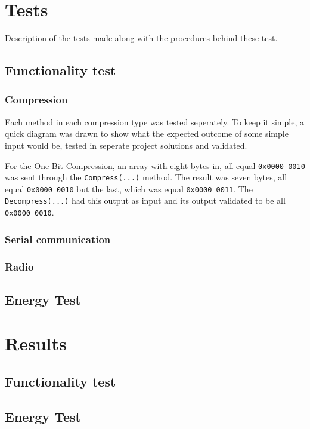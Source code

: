 \section{Tests}
Description of the tests made along with the procedures behind these test.

\subsection{Functionality test}

\subsubsection{Compression}
Each method in each compression type was tested seperately.
To keep it simple, a quick diagram was drawn to show what the expected outcome of some simple input would be, tested in seperate project solutions and validated.

For the One Bit Compression, an array with eight bytes in, all equal \texttt{0x0000 0010} was sent through the \texttt{Compress(...)} method.
The result was seven bytes, all equal \texttt{0x0000 0010} but the last, which was equal \texttt{0x0000 0011}.
The \texttt{Decompress(...)} had this output as input and its output validated to be all \texttt{0x0000 0010}.


\subsubsection{Serial communication}

\subsubsection{Radio}


\subsection{Energy Test}

\section{Results}

\subsection{Functionality test}

\subsection{Energy Test}